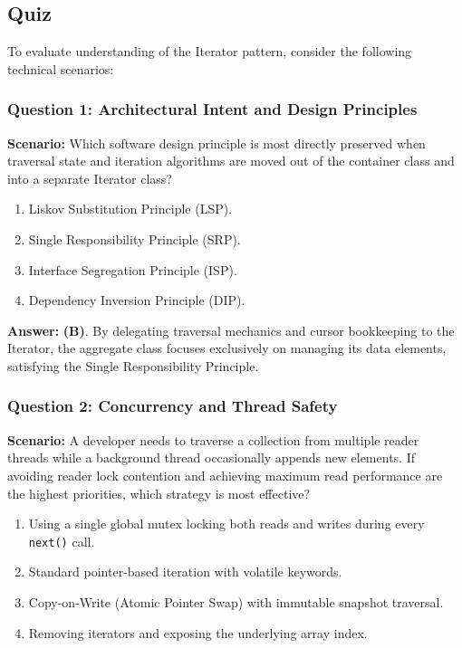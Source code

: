 \subsection{Quiz}

To evaluate understanding of the Iterator pattern, consider the following technical scenarios:

\subsubsection*{Question 1: Architectural Intent and Design Principles}
\textbf{Scenario:} Which software design principle is most directly preserved when traversal state and iteration algorithms are moved out of the container class and into a separate Iterator class?

\begin{enumerate}[label=(\Alph*)]
    \item Liskov Substitution Principle (LSP).
    \item Single Responsibility Principle (SRP).
    \item Interface Segregation Principle (ISP).
    \item Dependency Inversion Principle (DIP).
\end{enumerate}

\textbf{Answer:} \textbf{(B)}. By delegating traversal mechanics and cursor bookkeeping to the Iterator, the aggregate class focuses exclusively on managing its data elements, satisfying the Single Responsibility Principle.

\subsubsection*{Question 2: Concurrency and Thread Safety}
\textbf{Scenario:} A developer needs to traverse a collection from multiple reader threads while a background thread occasionally appends new elements. If avoiding reader lock contention and achieving maximum read performance are the highest priorities, which strategy is most effective?

\begin{enumerate}[label=(\Alph*)]
    \item Using a single global mutex locking both reads and writes during every \texttt{next()} call.
    \item Standard pointer-based iteration with volatile keywords.
    \item Copy-on-Write (Atomic Pointer Swap) with immutable snapshot traversal.
    \item Removing iterators and exposing the underlying array index.
\end{enumerate}

